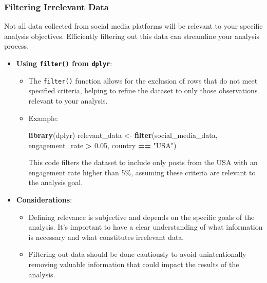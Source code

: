 \documentclass[
]{book}
\newenvironment{Shaded}{\begin{snugshade}}{\end{snugshade}}
\newcommand{\FloatTok}[1]{\textcolor[rgb]{0.00,0.00,0.81}{#1}}
\newcommand{\FunctionTok}[1]{\textcolor[rgb]{0.13,0.29,0.53}{\textbf{#1}}}
\newcommand{\NormalTok}[1]{#1}
\newcommand{\OtherTok}[1]{\textcolor[rgb]{0.56,0.35,0.01}{#1}}
\newcommand{\SpecialCharTok}[1]{\textcolor[rgb]{0.81,0.36,0.00}{\textbf{#1}}}
\newcommand{\StringTok}[1]{\textcolor[rgb]{0.31,0.60,0.02}{#1}}
\providecommand{\tightlist}{%
  \setlength{\itemsep}{0pt}\setlength{\parskip}{0pt}}
\begin{document}
\hypertarget{filtering-irrelevant-data}{%
\subsubsection{Filtering Irrelevant Data}\label{filtering-irrelevant-data}}

Not all data collected from social media platforms will be relevant to your specific analysis objectives. Efficiently filtering out this data can streamline your analysis process.

\begin{itemize}
\tightlist
\item
  \textbf{Using \texttt{filter()} from \texttt{dplyr}}:

  \begin{itemize}
  \item
    The \texttt{filter()} function allows for the exclusion of rows that do not meet specified criteria, helping to refine the dataset to only those observations relevant to your analysis.
  \item
    Example:

\begin{Shaded}
\begin{Highlighting}[]
\FunctionTok{library}\NormalTok{(dplyr)}
\NormalTok{relevant\_data }\OtherTok{\textless{}{-}} \FunctionTok{filter}\NormalTok{(social\_media\_data, engagement\_rate }\SpecialCharTok{\textgreater{}} \FloatTok{0.05}\NormalTok{, country }\SpecialCharTok{==} \StringTok{"USA"}\NormalTok{)}
\end{Highlighting}
\end{Shaded}

    This code filters the dataset to include only posts from the USA with an engagement rate higher than 5\%, assuming these criteria are relevant to the analysis goal.
  \end{itemize}
\item
  \textbf{Considerations}:

  \begin{itemize}
  \tightlist
  \item
    Defining relevance is subjective and depends on the specific goals of the analysis. It's important to have a clear understanding of what information is necessary and what constitutes irrelevant data.
  \item
    Filtering out data should be done cautiously to avoid unintentionally removing valuable information that could impact the results of the analysis.
  \end{itemize}
\end{itemize}
\end{document}
